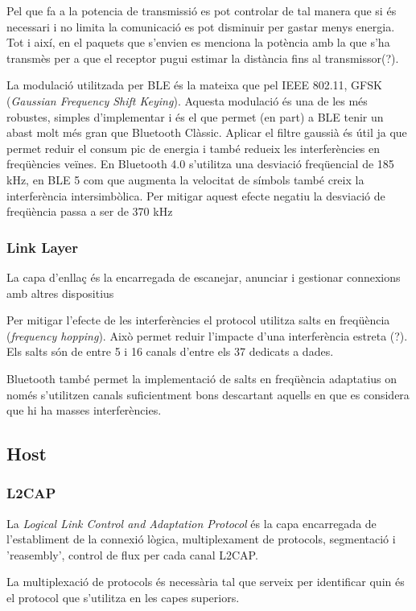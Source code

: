 Pel que fa a la potencia de transmissió es pot controlar de tal manera que si és necessari i no limita la comunicació es pot disminuir per gastar menys energia. Tot i així, en el paquets que s'envien es menciona la potència amb la que s'ha transmès per a que el receptor pugui estimar la distància fins al transmissor(?).

La modulació utilitzada per BLE és la mateixa que pel IEEE 802.11, GFSK (\textit{Gaussian Frequency Shift Keying}). Aquesta modulació és una de les més robustes, simples d'implementar i és el que permet (en part) a BLE tenir un abast molt més gran que Bluetooth Clàssic. Aplicar el filtre gaussià és útil ja que permet reduir el consum pic de energia \cite{BLE_Review} i també redueix les interferències en freqüències veïnes.
En Bluetooth 4.0 s'utilitza una desviació freqüencial de 185 kHz, en BLE 5 com que augmenta la velocitat de símbols també creix la interferència intersimbòlica. Per mitigar aquest efecte negatiu la desviació de freqüència passa a ser de 370 kHz


\subsubsection{Link Layer}

La capa d'enllaç és la encarregada de escanejar, anunciar i gestionar connexions amb altres dispositius

Per mitigar l'efecte de les interferències el protocol utilitza salts en freqüència (\textit{frequency hopping}). Això permet reduir l'impacte d'una interferència estreta (?). Els salts són de entre 5 i 16 canals d'entre els 37 dedicats a dades.

Bluetooth també permet la implementació de salts en freqüència adaptatius on només s'utilitzen canals suficientment bons descartant aquells en que es considera que hi ha masses interferències.

\subsection{Host}
\subsubsection{L2CAP}
La \textit{Logical Link Control and Adaptation Protocol} és la capa encarregada de l'establiment de la connexió lògica, multiplexament de protocols, segmentació i 'reasembly', control de flux per cada canal L2CAP.

La multiplexació de protocols és necessària tal que serveix per identificar quin és el protocol que s'utilitza en les capes superiors.


